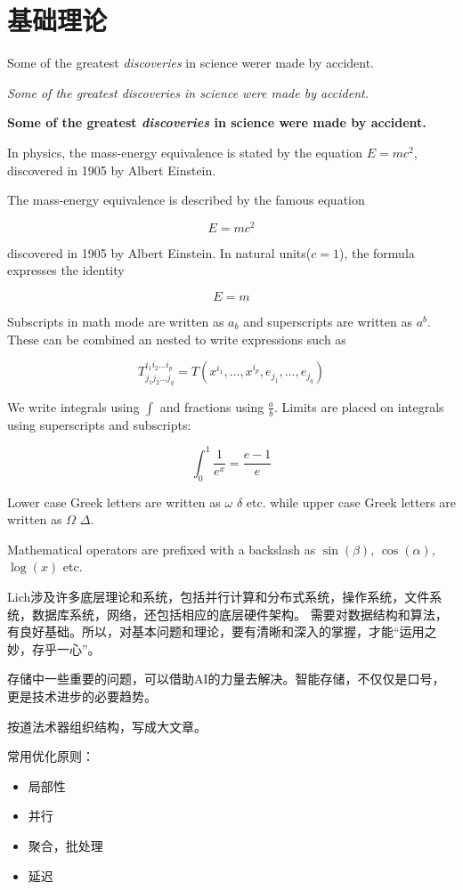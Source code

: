 \chapter{基础理论}

Some of the greatest \emph{discoveries} in science werer made by accident.

\textit{Some of the greatest \emph{discoveries} in science were made by accident.}

\textbf{Some of the greatest \emph{discoveries} in science were made by accident.}

In physics, the mass-energy equivalence is stated by the equation $E=mc^2$, discovered
in 1905 by Albert Einstein.

The mass-energy equivalence is described by the famous equation 

$$E=mc^2$$

discovered in 1905 by Albert Einstein.
In natural units($c = 1$), the formula expresses the identity

\begin{equation}
E=m
\end{equation}

Subscripts in math mode are written as $a_b$ and superscripts are written as $a^b$. 
These can be combined an nested to write expressions such as

$$T^{i_1 i_2 \dots i_p}_{j_1 j_2 \dots j_q} = T(x^{i_1},\dots,x^{i_p},e_{j_1},\dots,e_{j_q})$$

We write integrals using $\int$ and fractions using $\frac{a}{b}$. 
Limits are placed on integrals using superscripts and subscripts:

$$\int_0^1 \frac{1}{e^x} =  \frac{e-1}{e}$$

Lower case Greek letters are written as $\omega$ $\delta$ etc. 
while upper case Greek letters are written as $\Omega$ $\Delta$.

Mathematical operators are prefixed with a backslash as $\sin(\beta)$, $\cos(\alpha)$, $\log(x)$ etc.

Lich涉及许多底层理论和系统，包括并行计算和分布式系统，操作系统，文件系统，数据库系统，网络，还包括相应的底层硬件架构。
需要对数据结构和算法，有良好基础。所以，对基本问题和理论，要有清晰和深入的掌握，才能“运用之妙，存乎一心”。

存储中一些重要的问题，可以借助AI的力量去解决。智能存储，不仅仅是口号，更是技术进步的必要趋势。

按道法术器组织结构，写成大文章。

常用优化原则：
\begin{itemize}
    \item 局部性
    \item 并行
    \item 聚合，批处理
    \item 延迟
\end{itemize}

